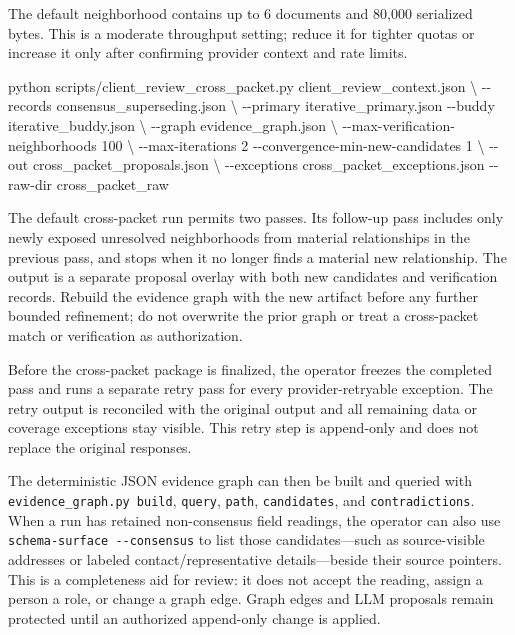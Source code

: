 \documentclass[
]{article}
\newenvironment{Shaded}{}{}
\newcommand{\AttributeTok}[1]{\textcolor[rgb]{0.49,0.56,0.16}{#1}}
\newcommand{\DataTypeTok}[1]{\textcolor[rgb]{0.56,0.13,0.00}{#1}}
\newcommand{\ExtensionTok}[1]{#1}
\newcommand{\NormalTok}[1]{#1}
\begin{document}
The default neighborhood contains up to 6 documents and 80,000
serialized bytes. This is a moderate throughput setting; reduce it for
tighter quotas or increase it only after confirming provider context and
rate limits.

\begin{Shaded}
\begin{Highlighting}[]
\ExtensionTok{python}\NormalTok{ scripts/client\_review\_cross\_packet.py client\_review\_context.json }\DataTypeTok{\textbackslash{}}
  \AttributeTok{{-}{-}records}\NormalTok{ consensus\_superseding.json }\DataTypeTok{\textbackslash{}}
  \AttributeTok{{-}{-}primary}\NormalTok{ iterative\_primary.json }\AttributeTok{{-}{-}buddy}\NormalTok{ iterative\_buddy.json }\DataTypeTok{\textbackslash{}}
  \AttributeTok{{-}{-}graph}\NormalTok{ evidence\_graph.json }\DataTypeTok{\textbackslash{}}
  \AttributeTok{{-}{-}max{-}verification{-}neighborhoods}\NormalTok{ 100 }\DataTypeTok{\textbackslash{}}
  \AttributeTok{{-}{-}max{-}iterations}\NormalTok{ 2 }\AttributeTok{{-}{-}convergence{-}min{-}new{-}candidates}\NormalTok{ 1 }\DataTypeTok{\textbackslash{}}
  \AttributeTok{{-}{-}out}\NormalTok{ cross\_packet\_proposals.json }\DataTypeTok{\textbackslash{}}
  \AttributeTok{{-}{-}exceptions}\NormalTok{ cross\_packet\_exceptions.json }\AttributeTok{{-}{-}raw{-}dir}\NormalTok{ cross\_packet\_raw}
\end{Highlighting}
\end{Shaded}

The default cross-packet run permits two passes. Its follow-up pass
includes only newly exposed unresolved neighborhoods from material
relationships in the previous pass, and stops when it no longer finds a
material new relationship. The output is a separate proposal overlay
with both new candidates and verification records. Rebuild the evidence
graph with the new artifact before any further bounded refinement; do
not overwrite the prior graph or treat a cross-packet match or
verification as authorization.

Before the cross-packet package is finalized, the operator freezes the
completed pass and runs a separate retry pass for every
provider-retryable exception. The retry output is reconciled with the
original output and all remaining data or coverage exceptions stay
visible. This retry step is append-only and does not replace the
original responses.

The deterministic JSON evidence graph can then be built and queried with
\texttt{evidence\_\allowbreak{}graph.py build}, \texttt{query},
\texttt{path}, \texttt{candidates}, and \texttt{contradictions}. When a
run has retained non-consensus field readings, the operator can also use
\texttt{schema-surface\ -\/-consensus} to list those candidates---such
as source-visible addresses or labeled contact/representative
details---beside their source pointers. This is a completeness aid for
review: it does not accept the reading, assign a person a role, or
change a graph edge. Graph edges and LLM proposals remain protected
until an authorized append-only change is applied.
\end{document}
